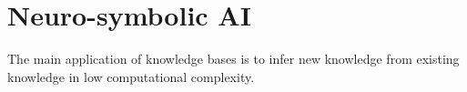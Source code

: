 

%
\chapter*{\thechapter \quad Neuro-symbolic AI}
\label{appendixA}

The main application of knowledge bases is to infer new knowledge from existing knowledge
in low computational complexity.
